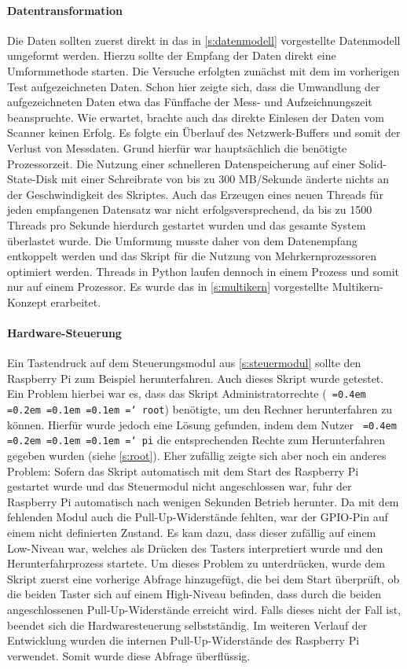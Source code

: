 \documentclass[a4paper,12pt,bibliography=totoc, listof=totoc,titlepage,pointlessnumbers]{scrreprt}
\newcommand*\justify{%
  \fontdimen2\font=0.4em%
  \fontdimen3\font=0.2em%
  \fontdimen4\font=0.1em%
  \fontdimen7\font=0.1em%
  \hyphenchar\font=`\-%
}
\newcommand{\code}[1]{\texttt{\justify{#1}}}
\begin{document}
\paragraph{Datentransformation}
Die Daten sollten zuerst direkt in das in \autoref{s:datenmodell} vorgestellte Datenmodell umgeformt werden. Hierzu sollte der Empfang der Daten direkt eine Umformmethode starten. Die Versuche erfolgten zunächst mit dem im vorherigen Test aufgezeichneten Daten. Schon hier zeigte sich, dass die Umwandlung der aufgezeichneten Daten etwa das Fünffache der Mess- und Aufzeichnungszeit beanspruchte. Wie erwartet, brachte auch das direkte Einlesen der Daten vom Scanner keinen Erfolg. Es folgte ein Überlauf des Netzwerk-Buffers und somit der Verlust von Messdaten. Grund hierfür war hauptsächlich die benötigte Prozessorzeit. Die Nutzung einer schnelleren Datenspeicherung auf einer Solid-State-Disk mit einer Schreibrate von bis zu 300 MB/Sekunde änderte nichts an der Geschwindigkeit des Skriptes. Auch das Erzeugen eines neuen Threads für jeden empfangenen Datensatz war nicht erfolgsversprechend, da bis zu 1500 Threads pro Sekunde hierdurch gestartet wurden und das gesamte System überlastet wurde. Die Umformung musste daher von dem Datenempfang entkoppelt werden und das Skript für die Nutzung von Mehrkernprozessoren optimiert werden. Threads in Python laufen dennoch in einem Prozess und somit nur auf einem Prozessor. Es wurde das in \autoref{s:multikern} vorgestellte Multikern-Konzept erarbeitet.

\paragraph{Hardware-Steuerung}
Ein Tastendruck auf dem Steuerungsmodul aus \autoref{s:steuermodul} sollte den Rasp\-berry Pi zum Beispiel herunterfahren. Auch dieses Skript wurde getestet. Ein Problem hierbei war es, dass das Skript Administratorrechte (\code{root}) benötigte, um den Rechner herunterfahren zu können. Hierfür wurde jedoch eine Lösung gefunden, indem dem Nutzer \code{pi} die entsprechenden Rechte zum Herunterfahren gegeben wurden (siehe \autoref{s:root}). Eher zufällig zeigte sich aber noch ein anderes Problem: Sofern das Skript automatisch mit dem Start des Rasp\-berry Pi gestartet wurde und das Steuermodul nicht angeschlossen war, fuhr der Rasp\-berry Pi automatisch nach wenigen Sekunden Betrieb herunter. Da mit dem fehlenden Modul auch die Pull-Up-Widerstände fehlten, war der GPIO-Pin auf einem nicht definierten Zustand. Es kam dazu, dass dieser zufällig auf einem Low-Niveau war, welches als Drücken des Tasters interpretiert wurde und den Herunterfahrprozess startete. Um dieses Problem zu unterdrücken, wurde dem Skript zuerst eine vorherige Abfrage hinzugefügt, die bei dem Start überprüft, ob die beiden Taster sich auf einem High-Niveau befinden, dass durch die beiden angeschlossenen Pull-Up-Widerstände erreicht wird. Falls dieses nicht der Fall ist, beendet sich die Hardwaresteuerung selbst\-stän\-dig. Im weiteren Verlauf der Entwicklung wurden die internen Pull-Up-Widerstände des Rasp\-berry Pi verwendet. Somit wurde diese Abfrage überflüssig.
\end{document}
